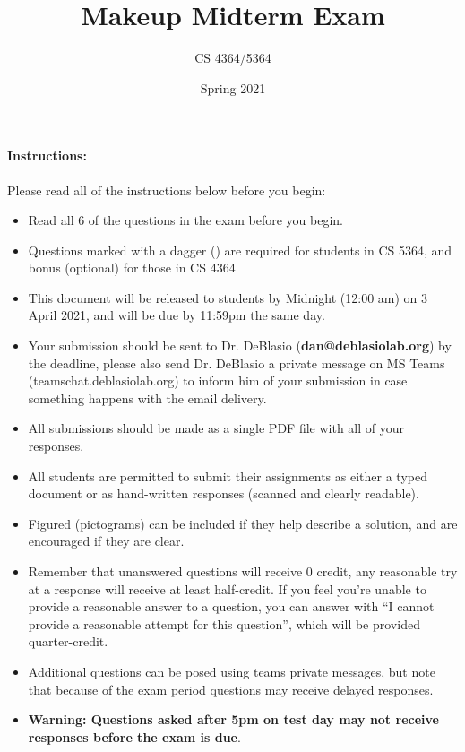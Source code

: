 \documentclass[11pt, oneside]{article}   	%
\title{Makeup Midterm Exam}
\author{CS 4364/5364}
\date{Spring 2021}							%
\begin{document}
\maketitle

\paragraph{Instructions:}
Please read all of the instructions below before you begin:
\begin{itemize}
\item Read all 6 of the questions in the exam before you begin. 
\item Questions marked with a dagger (\dag) are required for students in CS 5364, and bonus (optional) for those in CS 4364
\item This document will be released to students by Midnight (12:00 am) on 3 April 2021, and will be due by 11:59pm the same day. 
\item Your submission should be sent to Dr. DeBlasio (\textbf{dan@deblasiolab.org}) by the deadline, please also send Dr. DeBlasio a private message on MS Teams (teamschat.deblasiolab.org) to inform him of your submission in case something happens with the email delivery. 
\item All submissions should be made as a single PDF file with all of your responses. 
\item All students are permitted to submit their assignments as either a typed document or as hand-written responses (scanned and clearly readable). 
\item Figured (pictograms) can be included if they help describe a solution, and are encouraged if they are clear. 
\item Remember that unanswered questions will receive 0 credit, any reasonable try at a response will receive at least half-credit. If you feel you're unable to provide a reasonable answer to a question, you can answer with ``I cannot provide a reasonable attempt for this question'', which will be provided quarter-credit. 
\item Additional questions can be posed using teams private messages, but note that because of the exam period questions may receive delayed responses. 
\item \textbf{{\color{red}Warning:} Questions asked after 5pm on test day may not receive responses before the exam is due}.  
\end{itemize}
\end{document}
